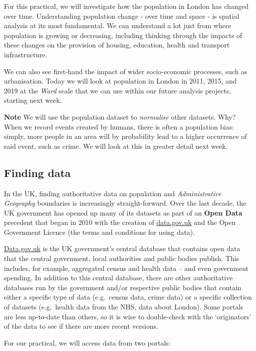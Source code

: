 \documentclass[
]{book}
\begin{document}
For this practical, we will investigate how the population in London has changed over time. Understanding population change - over time and space - is spatial analysis at its most fundamental. We can understand a lot just from where population is growing or decreasing, including thinking through the impacts of these changes on the provision of housing, education, health and transport infrastructure.

We can also see first-hand the impact of wider socio-economic processes, such as urbanisation. Today we will look at population in London in 2011, 2015, and 2019 at the \emph{Ward} scale that we can use within our future analysis projects, starting next week.

\textbf{Note}
We will use the population dataset to \emph{normalise} other datasets. Why? When we record events created by humans, there is often a population bias: simply, more people in an area will by probability lead to a higher occurrence of said event, such as crime. We will look at this in greater detail next week.

\hypertarget{w02-finding}{%
\subsection{Finding data}\label{w02-finding}}

In the UK, finding authoritative data on population and \emph{Administrative Geography} boundaries is increasingly straight-forward. Over the last decade, the UK government has opened up many of its datasets as part of an \textbf{Open Data} precedent that began in 2010 with the creation of \url{data.gov.uk} and the Open Government Licence (the terms and conditions for using data).

\href{www.data.gov.uk}{Data.gov.uk} is the UK government's central database that contains open data that the central government, local authorities and public bodies publish. This includes, for example, aggregated census and health data -- and even government spending. In addition to this central database, there are other authoritative databases run by the government and/or respective public bodies that contain either a specific type of data (e.g.~census data, crime data) or a specific collection of datasets (e.g.~health data from the NHS, data about London). Some portals are less up-to-date than others, so it is wise to double-check with the `originators' of the data to see if there are more recent versions.

For our practical, we will access data from two portals:
\end{document}
